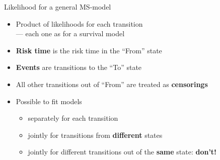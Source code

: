 \begin{frame}[fragile]{Likelihood for a general MS-model}
  \begin{itemize}[<+->]
  \item Product of likelihoods for each transition\\
        --- each one as for a survival model
  \item \textbf{Risk time} is the risk time in the ``From'' state
  \item \textbf{Events} are transitions to the ``To'' state
  \item All other transitions out of ``From'' are treated as \textbf{censorings}
  \item Possible to fit models

    \begin{itemize}
    \item separately for each transition
    \item jointly for transitions from \textbf{different} states
    \item jointly for different transitions out of the \textbf{same}
      state: \textbf{don't!}  
    \end{itemize}
    
  \end{itemize}
\end{frame}


